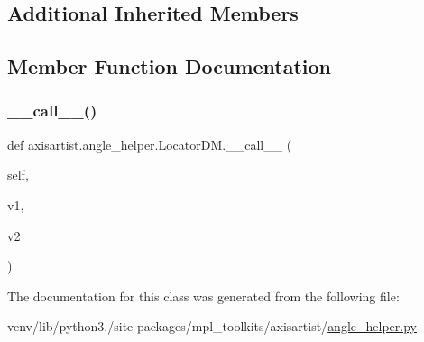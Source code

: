 \subsection*{Additional Inherited Members}


\subsection{Member Function Documentation}
\mbox{\label{classaxisartist_1_1angle__helper_1_1LocatorDM_af7bd5dabcd2de906ee3655b737f16bdb}} 
\subsubsection{\texorpdfstring{\+\_\+\+\_\+call\+\_\+\+\_\+()}{\_\_call\_\_()}}
{\footnotesize\ttfamily def axisartist.\+angle\+\_\+helper.\+Locator\+D\+M.\+\_\+\+\_\+call\+\_\+\+\_\+ (\begin{DoxyParamCaption}\item[{}]{self,  }\item[{}]{v1,  }\item[{}]{v2 }\end{DoxyParamCaption})}



The documentation for this class was generated from the following file\+:\begin{DoxyCompactItemize}
\item 
venv/lib/python3./site-\/packages/mpl\+\_\+toolkits/axisartist/\hyperlink{axisartist_2angle__helper_8py}{angle\+\_\+helper.\+py}\end{DoxyCompactItemize}
